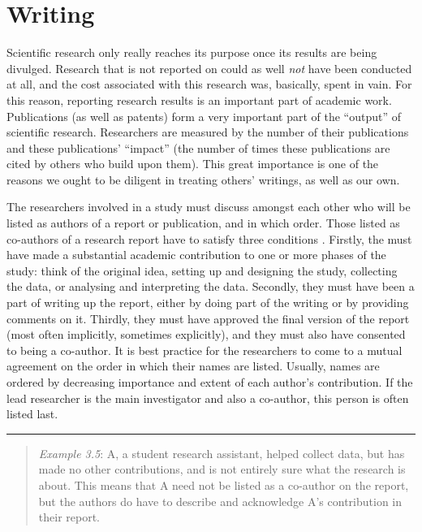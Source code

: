 \documentclass[
]{book}
\begin{document}
\hypertarget{writing}{%
\section{Writing}\label{writing}}

Scientific research only really reaches its purpose once its results are being divulged. Research that is not reported on could as well \emph{not} have been conducted at all, and the cost associated with this research was, basically, spent in vain. For this reason, reporting research results is an important part of academic work. Publications (as well as patents) form a very important part of the ``output'' of scientific research. Researchers are measured by the number of their publications and these publications' ``impact'' (the number of times these publications are cited by others who build upon them). This great importance is one of the reasons we ought to be diligent in treating others' writings, as well as our own.

The researchers involved in a study must discuss amongst each other who will be listed as authors of a report or publication, and in which order. Those listed as co-authors of a research report have to satisfy three conditions \citep[Ch.10]{ORI12}. Firstly, the must have made a substantial academic contribution to one or more phases of the study: think of the original idea, setting up and designing the study, collecting the data, or analysing and interpreting the data. Secondly, they must have been a part of writing up the report, either by doing part of the writing or by providing comments on it. Thirdly, they must have approved the final version of the report (most often implicitly, sometimes explicitly), and they must also have consented to being a co-author. It is best practice for the researchers to come to a mutual agreement on the order in which their names are listed. Usually, names are ordered by decreasing importance and extent of each author's contribution. If the lead researcher is the main investigator and also a co-author, this person is often listed last.

\begin{center}\rule{0.5\linewidth}{0.5pt}\end{center}

\begin{quote}
\emph{Example 3.5}: A, a student research assistant, helped collect data, but has made no other contributions, and is not entirely sure what the research is about. This means that A need not be listed as a co-author on the report, but the authors do have to describe and acknowledge A's contribution in their report.
\end{quote}
\end{document}
